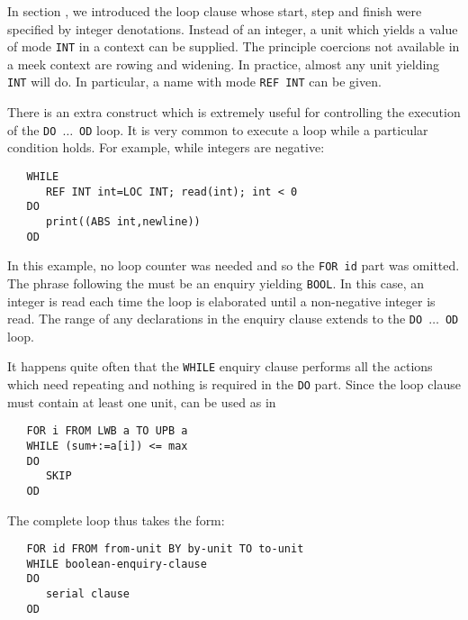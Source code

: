 In section , we introduced the loop clause whose
start, step and finish were specified by integer denotations.
Instead of an integer, a unit which yields a value of mode \verb|INT|
in a  context can be supplied.  The principle
coercions not available in a meek context are rowing and widening.
In practice, almost any unit yielding \verb|INT| will do. In
particular, a name with mode \verb|REF INT| can be given.

There is an extra construct which is extremely useful for controlling
the execution of the \verb|DO|~$\ldots$~\verb|OD| loop.  It is very
common to execute a loop while a particular condition holds.  For
example, while integers are negative:
\begin{verbatim}
   WHILE
      REF INT int=LOC INT; read(int); int < 0
   DO
      print((ABS int,newline))
   OD
\end{verbatim}
\noindent
In this example, no loop counter was needed and so the \verb|FOR id|
part was omitted.  The phrase following the  must be an
enquiry  yielding \verb|BOOL|. In this
case, an integer is read each time the loop is elaborated until a
non-negative integer is read. The range of any declarations in the
enquiry clause extends to the \verb|DO|~$\ldots$~\verb|OD| loop.

It happens quite often that the \verb|WHILE| enquiry clause performs
all the actions which need repeating and nothing is required in the
\verb|DO| part. Since the loop clause must contain at least one unit,
 can be used as in
\begin{verbatim}
   FOR i FROM LWB a TO UPB a
   WHILE (sum+:=a[i]) <= max
   DO
      SKIP
   OD
\end{verbatim}
\noindent
The complete loop  thus takes the form:
\begin{verbatim}
   FOR id FROM from-unit BY by-unit TO to-unit
   WHILE boolean-enquiry-clause
   DO
      serial clause
   OD
\end{verbatim}
\newpage

